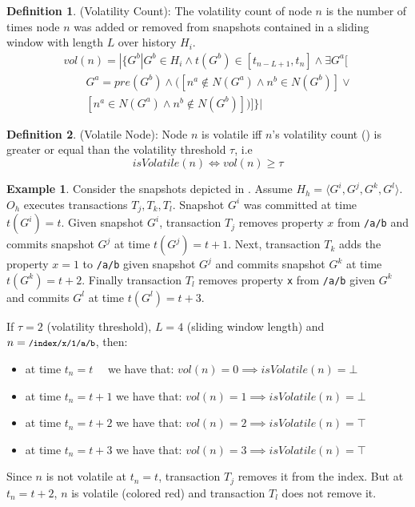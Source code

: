 \documentclass[abstracton,12pt]{scrartcl}
\theoremstyle{definition}
\newtheorem{definition}{Definition}
\newtheorem{example}{Example}
\begin{document}
\begin{definition}
    (Volatility Count): The volatility count of node $n$ is the number of times node $n$ was added or removed from snapshots contained in a sliding window with length $L$ over history $H_i$.
    \begin{equation}
        \begin{split}
            vol(n) = | \{ G^b | G^b \in H_i \land t(G^b) \in [t_{n-L+1}, t_n] \land \exists G^a[ \\
            \qquad G^a = pre(G^b) \land ([n^a \notin N(G^a) \land n^b \in N(G^b)]\lor \\
            \qquad [n^a \in N(G^a) \land n^b \notin N(G^b)] )]\} |
        \end{split}
    \end{equation}
    \label{def:vol_count}
\end{definition}

\begin{definition}
    (Volatile Node): Node $n$ is volatile iff $n$'s volatility count () is greater or equal than the volatility threshold $\tau$, i.e 
    $$ isVolatile(n) \iff vol(n) \geq \tau $$
\end{definition}

\begin{example}
    Consider the snapshots depicted in .
    Assume $H_h = \langle G^i,G^j,G^k,G^l \rangle$.
    $O_h$ executes transactions $T_j, T_k, T_l$. Snapshot $G^i$ was committed at time $t(G^i) = t$.
    Given snapshot $G^i$, transaction $T_j$ removes property $x$ from \texttt{/a/b} and commits snapshot $G^j$ at time $t(G^j) = t + 1$.
    Next, transaction $T_k$ adds the property $x=1$ to \texttt{/a/b} given snapshot $G^j$ and commits snapshot $G^k$ at time $t(G^k) = t + 2$.
    Finally transaction $T_l$ removes property \texttt{x} from \texttt{/a/b} given $G^k$ and commits $G^l$ at time $t(G^l) = t + 3$.

    If $\tau = 2$ (volatility threshold), $L = 4$ (sliding window length) and $n = \texttt{\footnotesize /index/x/1/a/b}$, then:
    \begin{itemize}
        \item at time $t_n = t$ \quad \ \ we have that: \quad $vol(n) = 0 \implies isVolatile(n) = \bot$
        \item at time $t_n = t + 1 $ we have that: \quad $ vol(n) = 1  \implies isVolatile(n) = \bot$
        \item at time $t_n = t + 2 $ we have that: \quad $ vol(n) = 2  \implies isVolatile(n) = \top$
        \item at time $t_n = t + 3 $ we have that: \quad $ vol(n) = 3  \implies isVolatile(n) = \top$
    \end{itemize}
    
    Since $n$ is not volatile at $t_n = t$, transaction $T_j$ removes it from the index.
    But at $t_n = t + 2$, $n$ is volatile (colored red) and transaction $T_l$ does not remove it.
\end{example}
\end{document}
